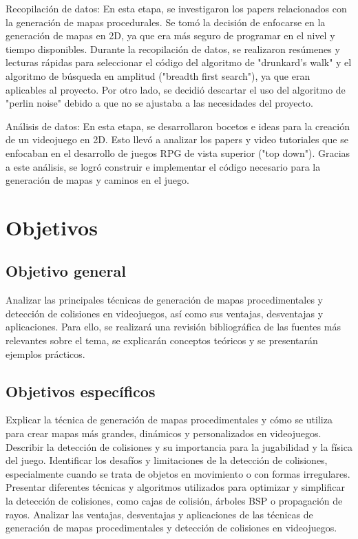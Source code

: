 \documentclass[stu, 12pt, letterpaper, donotrepeattitle, floatsintext, natbib]{apa7}
\begin{document}
Recopilación de datos:
En esta etapa, se investigaron los papers relacionados con la generación de mapas procedurales. Se tomó la decisión de enfocarse en la generación de mapas en 2D, ya que era más seguro de programar en el nivel y tiempo disponibles. Durante la recopilación de datos, se realizaron resúmenes y lecturas rápidas para seleccionar el código del algoritmo de "drunkard's walk" y el algoritmo de búsqueda en amplitud ("breadth first search"), ya que eran aplicables al proyecto. Por otro lado, se decidió descartar el uso del algoritmo de "perlin noise" debido a que no se ajustaba a las necesidades del proyecto.

Análisis de datos:
En esta etapa, se desarrollaron bocetos e ideas para la creación de un videojuego en 2D. Esto llevó a analizar los papers y video tutoriales que se enfocaban en el desarrollo de juegos RPG de vista superior ("top down"). Gracias a este análisis, se logró construir e implementar el código necesario para la generación de mapas y caminos en el juego.
\noindent {}

\vspace{10pt}
\vspace{10pt}
\vspace{10pt}
\vspace{10pt}
\vspace{10pt}
\vspace{10pt}
\newpage
\section{\large Objetivos}
\subsection{Objetivo general} 
Analizar las principales técnicas de generación de mapas procedimentales y detección de colisiones en videojuegos, así como sus ventajas, desventajas y aplicaciones. Para ello, se realizará una revisión bibliográfica de las fuentes más relevantes sobre el tema, se explicarán conceptos teóricos y se presentarán ejemplos prácticos.
\subsection{Objetivos específicos} 
Explicar la técnica de generación de mapas procedimentales y cómo se utiliza para crear mapas más grandes, dinámicos y personalizados en videojuegos.
Describir la detección de colisiones y su importancia para la jugabilidad y la física del juego.
Identificar los desafíos y limitaciones de la detección de colisiones, especialmente cuando se trata de objetos en movimiento o con formas irregulares.
Presentar diferentes técnicas y algoritmos utilizados para optimizar y simplificar la detección de colisiones, como cajas de colisión, árboles BSP o propagación de rayos.
Analizar las ventajas, desventajas y aplicaciones de las técnicas de generación de mapas procedimentales y detección de colisiones en videojuegos.
\end{document}
